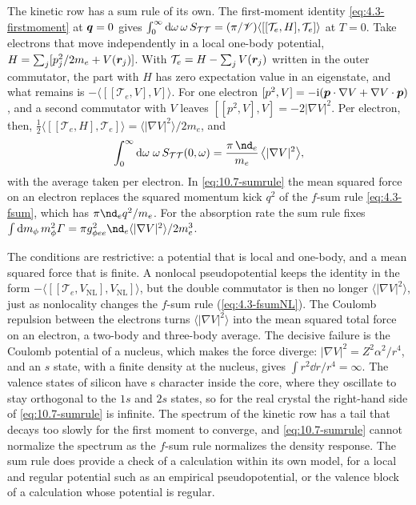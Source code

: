 The kinetic row has a sum rule of its own. The first-moment identity \cref{eq:4.3-firstmoment} at $\bm{q} = 0$ gives $\int_0^\infty\mathrm{d}\omega\,\omega\,S_{\mathcal{T}\mathcal{T}} = (\pi/\mathscr{V})\langle[[\mathcal{T}_e, H], \mathcal{T}_e]\rangle$ at $T = 0$. Take electrons that move independently in a local one-body potential, $H = \sum_j[p_j^2/2m_e + V(\bm{r}_j)]$. With $\mathcal{T}_e = H - \sum_jV(\bm{r}_j)$ written in the outer commutator, the part with $H$ has zero expectation value in an eigenstate, and what remains is $-\langle[[\mathcal{T}_e, V], V]\rangle$. For one electron $[p^2, V] = -\mathrm{i}(\bm{p}\cdot\nabla V + \nabla V\cdot\bm{p})$, and a second commutator with $V$ leaves $[[p^2, V], V] = -2|\nabla V|^2$. Per electron, then, $\frac12\langle[[\mathcal{T}_e, H], \mathcal{T}_e]\rangle = \langle|\nabla V|^2\rangle/2m_e$, and
\begin{equation}
  \int_0^\infty\dd\omega\;\omega\,S_{\mathcal{T}\mathcal{T}}(0,\omega) = \frac{\pi\,\nd_e}{m_e}\,\bigl\langle|\nabla V|^2\bigr\rangle ,
  \label{eq:10.7-sumrule}
\end{equation}
with the average taken per electron. In \cref{eq:10.7-sumrule} the mean squared force on an electron replaces the squared momentum kick $q^2$ of the $f$-sum rule \cref{eq:4.3-fsum}, which has $\pi\nd_eq^2/m_e$. For the absorption rate the sum rule fixes $\int\dd m_\phi\,m_\phi^2\varGamma = \pi g_{\phi ee}^2\nd_e\langle|\nabla V|^2\rangle/2m_e^3$.

The conditions are restrictive: a potential that is local and one-body, and a mean squared force that is finite. A nonlocal pseudopotential keeps the identity in the form $-\langle[[\mathcal{T}_e,V_{\mathrm{NL}}],V_{\mathrm{NL}}]\rangle$, but the double commutator is then no longer $\langle|\nabla V|^2\rangle$, just as nonlocality changes the $f$-sum rule (\cref{eq:4.3-fsumNL}). The Coulomb repulsion between the electrons turns $\langle|\nabla V|^2\rangle$ into the mean squared total force on an electron, a two-body and three-body average. The decisive failure is the Coulomb potential of a nucleus, which makes the force diverge: $|\nabla V|^2 = Z^2\alpha^2/r^4$, and an $s$ state, with a finite density at the nucleus, gives $\int r^2\dd r/r^4 = \infty$. The valence states of silicon have s character inside the core, where they oscillate to stay orthogonal to the $1s$ and $2s$ states, so for the real crystal the right-hand side of \cref{eq:10.7-sumrule} is infinite. The spectrum of the kinetic row has a tail that decays too slowly for the first moment to converge, and \cref{eq:10.7-sumrule} cannot normalize the spectrum as the $f$-sum rule normalizes the density response. The sum rule does provide a check of a calculation within its own model, for a local and regular potential such as an empirical pseudopotential, or the valence block of a calculation whose potential is regular.

